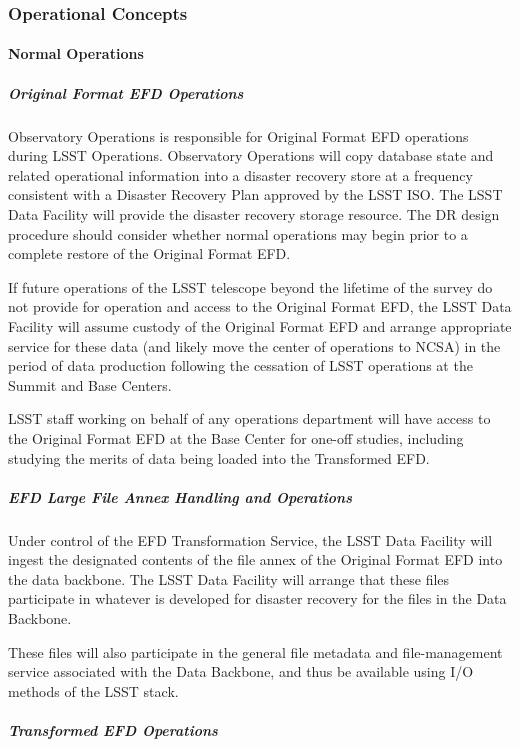 \subsubsection{Operational Concepts}

\paragraph{Normal Operations}

\subparagraph{Original Format EFD Operations}

Observatory Operations is responsible for Original Format EFD
operations during LSST Operations. Observatory
Operations will copy database state and related operational
information into a disaster recovery store at a frequency consistent
with a Disaster Recovery Plan approved by the LSST ISO. The LSST Data
Facility will provide the disaster recovery storage resource. The DR
design procedure should consider whether normal operations may begin
prior to a complete restore of the Original Format EFD.

If future operations of the LSST telescope beyond the lifetime of the
survey do not provide for operation and access to the Original Format
EFD, the LSST Data Facility will assume custody of the Original Format
EFD and arrange appropriate service for these data (and likely move
the center of operations to NCSA) in the period of data production
following the cessation of LSST operations at the Summit and Base
Centers.

LSST staff working on behalf of any operations department will have
access to the Original Format EFD at the Base Center for one-off
studies, including studying the merits of data being loaded into the
Transformed EFD. 

\subparagraph{EFD Large File Annex Handling and Operations}

Under control of the EFD Transformation Service, the LSST Data Facility will
ingest the designated contents of the file annex of the Original
Format EFD into the data backbone. The LSST Data Facility will arrange that these
files participate in whatever is developed for disaster recovery for the
files in the Data Backbone.

These files will also participate in the general file metadata and
file-management service associated with the Data Backbone, and thus be
available using I/O methods of the LSST stack.

\subparagraph{Transformed EFD Operations}


